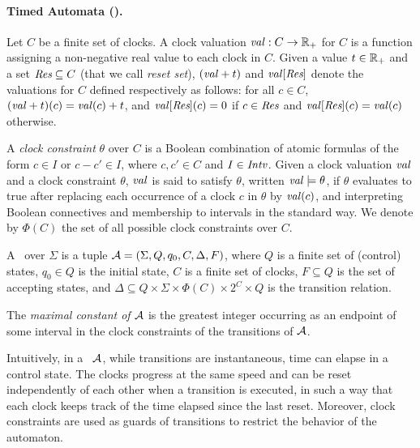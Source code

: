 \paragraph{Timed Automata (\TA).} Let $C$ be a finite set of clocks. A clock valuation ${\mathit{val}}:C\to {\mathbb{R}_+}$ for $C$ is a function
 assigning a non-negative real value to each clock in $C$.
Given a value $t\in{\mathbb{R}_+}$ and a set $\textit{Res}\subseteq C$ (that we call \emph{reset set}), $({\mathit{val}}+ t)$ and ${\mathit{val}}[\textit{Res}]$ denote the valuations for $C$ defined respectively as follows: for all $c\in C$,
 $({\mathit{val}} +t)(c) = {\mathit{val}}(c)+t$, and ${\mathit{val}}[\textit{Res}](c)=0$ if $c\in \textit{Res}$ and ${\mathit{val}}[\textit{Res}](c)={\mathit{val}}(c)$ otherwise.

 A \emph{clock constraint} $\theta$ over $C$ is a Boolean combination of atomic formulas of the form
$c \in I$ or $c-c'\in I$, where $c,c'\in C$ and
$I\in{\mathit{Intv}}$.
Given a clock valuation ${\mathit{val}}$ and a clock constraint $\theta$, ${\mathit{val}}$ is said to satisfy $\theta$, written
${\mathit{val}}\models \theta$, if 
$\theta$ evaluates to true after replacing each occurrence of a clock $c$ in $\theta$ by ${\mathit{val}}(c)$, and interpreting Boolean connectives and membership to intervals in the standard way. 
%
We denote by $\Phi(C)$ the set of all possible clock constraints over $C$.

\begin{definition}
 A  \TA\ over  $\Sigma$ is a tuple
$\mathcal{A}=(\Sigma, Q,q_0,C,\Delta,F)$, where $Q$ is a finite
set of (control) states, $q_0\in Q$ is the initial
state, $C$ is a finite set of clocks,
$F\subseteq Q$ is the set of accepting states, and $\Delta \subseteq Q\times \Sigma \times \Phi(C) \times 2^{C} \times Q $ is the transition relation.

The \emph{maximal constant of $\mathcal{A}$} is the greatest integer occurring as an endpoint of some interval in the clock constraints of the transitions of $\mathcal{A}$.
\end{definition}

Intuitively, in a \TA\  $\mathcal{A}$, while transitions are instantaneous, time can elapse in a control
state. The clocks  progress at the same speed  and can
be reset independently of each other when a transition is executed, in such a way that each clock
keeps track of the time elapsed since the last reset. Moreover, clock constraints
are used as guards of transitions to restrict the behavior of the
automaton.

